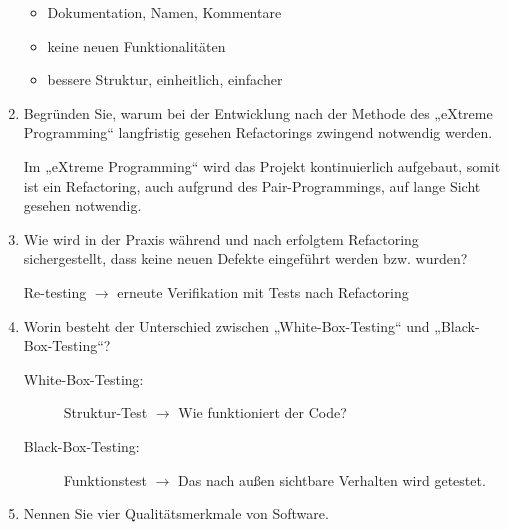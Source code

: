 \documentclass{bschlangaul-aufgabe}
\begin{document}
\begin{enumerate}
\begin{liAntwort}
\begin{itemize}
\item Dokumentation, Namen, Kommentare
\item keine neuen Funktionalitäten
\item bessere Struktur, einheitlich, einfacher
\end{itemize}
\end{liAntwort}

%

\item Begründen Sie, warum bei der Entwicklung nach der Methode des
„eXtreme Programming“ langfristig gesehen
Refactorings zwingend notwendig werden.

\begin{liAntwort}
Im „eXtreme Programming“ wird das Projekt kontinuierlich aufgebaut,
somit ist ein Refactoring, auch aufgrund des Pair-Programmings, auf
lange Sicht gesehen notwendig.
\end{liAntwort}

%

\item Wie wird in der Praxis während und nach erfolgtem Refactoring
sichergestellt, dass keine neuen Defekte eingeführt werden bzw. wurden?

\begin{liAntwort}
Re-testing $\rightarrow$ erneute Verifikation mit Tests nach Refactoring
\end{liAntwort}

%

\item Worin besteht der Unterschied zwischen
„White-Box-Testing“ und
„Black-Box-Testing“?

\begin{liAntwort}
\begin{description}
\item[White-Box-Testing:]
Struktur-Test $\rightarrow$ Wie funktioniert der Code?

\item[Black-Box-Testing:]
Funktionstest $\rightarrow$ Das nach außen sichtbare Verhalten wird
getestet.
\end{description}
\end{liAntwort}

%

\item Nennen Sie vier Qualitätsmerkmale von Software.


\end{enumerate}
\end{document}
